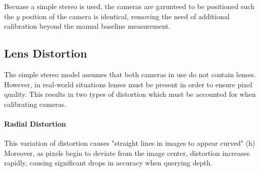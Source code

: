 \documentclass[11pt]{scrartcl}
\begin{document}
\begin{remark}
    Becuase a simple stereo is used, the cameras are garunteed to be positioned 
    such the $y$ position of the camera is identical, removing the need of additional 
    calibration beyond the manual baseline measurement. 
\end{remark}

\subsection{Lens Distortion}
The simple stereo model assumes that both cameras in use do not contain lenses. 
However, in real-world situations lenses must be present in order to ensure pixel 
quality. This results in two types of distortion which must be accounted for when
calibrating cameras.  
\paragraph{Radial Distortion}
    This variation of distortion causes "straight lines in images to appear curved" (h)
    Moreover, as pixels begin to deviate from the image center, distortion increases rapidly, 
    causing significant drops in accuracy when querying depth. 
\end{document}
